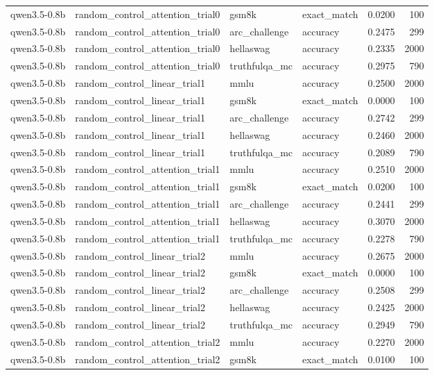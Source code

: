 \begin{tabular}{llllrr}
qwen3.5-0.8b & random_control_attention_trial0 & gsm8k & exact_match & 0.0200 & 100 \\
qwen3.5-0.8b & random_control_attention_trial0 & arc_challenge & accuracy & 0.2475 & 299 \\
qwen3.5-0.8b & random_control_attention_trial0 & hellaswag & accuracy & 0.2335 & 2000 \\
qwen3.5-0.8b & random_control_attention_trial0 & truthfulqa_mc & accuracy & 0.2975 & 790 \\
qwen3.5-0.8b & random_control_linear_trial1 & mmlu & accuracy & 0.2500 & 2000 \\
qwen3.5-0.8b & random_control_linear_trial1 & gsm8k & exact_match & 0.0000 & 100 \\
qwen3.5-0.8b & random_control_linear_trial1 & arc_challenge & accuracy & 0.2742 & 299 \\
qwen3.5-0.8b & random_control_linear_trial1 & hellaswag & accuracy & 0.2460 & 2000 \\
qwen3.5-0.8b & random_control_linear_trial1 & truthfulqa_mc & accuracy & 0.2089 & 790 \\
qwen3.5-0.8b & random_control_attention_trial1 & mmlu & accuracy & 0.2510 & 2000 \\
qwen3.5-0.8b & random_control_attention_trial1 & gsm8k & exact_match & 0.0200 & 100 \\
qwen3.5-0.8b & random_control_attention_trial1 & arc_challenge & accuracy & 0.2441 & 299 \\
qwen3.5-0.8b & random_control_attention_trial1 & hellaswag & accuracy & 0.3070 & 2000 \\
qwen3.5-0.8b & random_control_attention_trial1 & truthfulqa_mc & accuracy & 0.2278 & 790 \\
qwen3.5-0.8b & random_control_linear_trial2 & mmlu & accuracy & 0.2675 & 2000 \\
qwen3.5-0.8b & random_control_linear_trial2 & gsm8k & exact_match & 0.0000 & 100 \\
qwen3.5-0.8b & random_control_linear_trial2 & arc_challenge & accuracy & 0.2508 & 299 \\
qwen3.5-0.8b & random_control_linear_trial2 & hellaswag & accuracy & 0.2425 & 2000 \\
qwen3.5-0.8b & random_control_linear_trial2 & truthfulqa_mc & accuracy & 0.2949 & 790 \\
qwen3.5-0.8b & random_control_attention_trial2 & mmlu & accuracy & 0.2270 & 2000 \\
qwen3.5-0.8b & random_control_attention_trial2 & gsm8k & exact_match & 0.0100 & 100 \\

\end{tabular}
